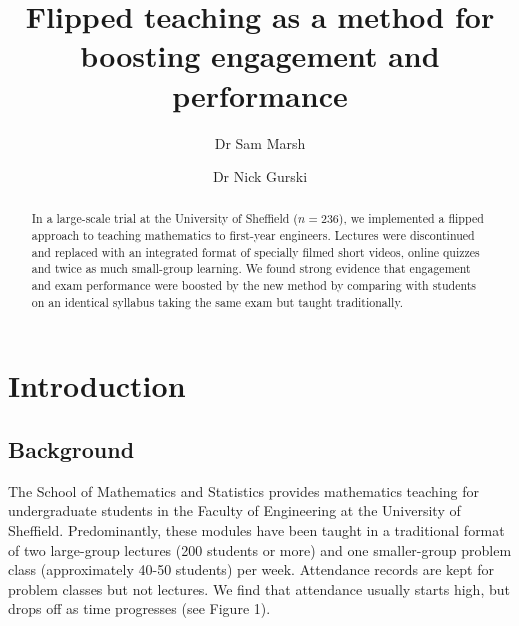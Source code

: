 \documentclass{amsart}
\title{Flipped teaching as a method for boosting engagement and performance}
\author{Dr Sam Marsh}
\author{Dr Nick Gurski}
\begin{document}
\maketitle

\begin{abstract}
In a large-scale trial at the University of Sheffield ($n=236$), we implemented a flipped approach to teaching mathematics to first-year engineers. Lectures were discontinued and replaced with an integrated format of specially filmed short videos, online quizzes and twice as much small-group learning.  We found strong evidence that engagement and exam performance were boosted by the new method by comparing with students on an identical syllabus taking the same exam but taught traditionally.
\end{abstract}

\section{Introduction}

\subsection{Background}

The School of Mathematics and Statistics provides mathematics teaching for undergraduate students in the Faculty of Engineering at the University of Sheffield. Predominantly, these modules have been taught in a traditional format of two large-group lectures (200 students or more) and one smaller-group problem class (approximately 40-50 students) per week.  Attendance records are kept for problem classes but not lectures.  We find that attendance usually starts high, but drops off as time progresses (see Figure 1).
\end{document}
